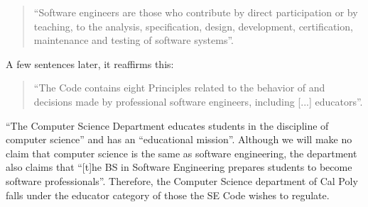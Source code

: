 \documentclass[11pt]{article}
\begin{document}
\begin{multicols}{2}
\begin{quote}
``Software engineers are those who contribute by direct participation or by teaching, to the analysis, specification, design, development, certification, maintenance and testing of software systems''. \cite{secode}
\end{quote}

A few sentences later, it reaffirms this:

\begin{quote}
``The Code contains eight Principles related to the behavior of and decisions made by professional software engineers, including [...] educators''. \cite{secode}
\end{quote}


``The Computer Science Department educates students in the discipline of computer science'' and has an ``educational mission''. \cite{catalogDept}  Although we will make no claim that computer science is the same as software engineering, the department also claims that ``[t]he BS in Software Engineering prepares students to become software professionals''. \cite{catalogDept}  Therefore, the Computer Science department of Cal Poly falls under the educator category of those the SE Code wishes to regulate.


\end{multicols}
\end{document}
